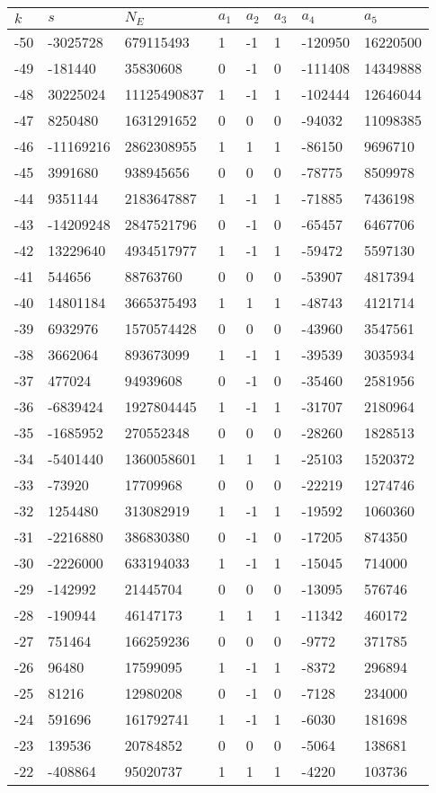 \documentclass{amsart}
\begin{document}
\begin{longtable}{|l|l|l|lllll|}
\hline
$k$ & $s$ & $N_E$ & $a_1$ & $a_2$ & $a_3$ & $a_4$ & $a_5$\\
\hline
-50&-3025728&679115493&1&-1&1&-120950&16220500\\
-49&-181440&35830608&0&-1&0&-111408&14349888\\
-48&30225024&11125490837&1&-1&1&-102444&12646044\\
-47&8250480&1631291652&0&0&0&-94032&11098385\\
-46&-11169216&2862308955&1&1&1&-86150&9696710\\
-45&3991680&938945656&0&0&0&-78775&8509978\\
-44&9351144&2183647887&1&-1&1&-71885&7436198\\
-43&-14209248&2847521796&0&-1&0&-65457&6467706\\
-42&13229640&4934517977&1&-1&1&-59472&5597130\\
-41&544656&88763760&0&0&0&-53907&4817394\\
-40&14801184&3665375493&1&1&1&-48743&4121714\\
-39&6932976&1570574428&0&0&0&-43960&3547561\\
-38&3662064&893673099&1&-1&1&-39539&3035934\\
-37&477024&94939608&0&-1&0&-35460&2581956\\
-36&-6839424&1927804445&1&-1&1&-31707&2180964\\
-35&-1685952&270552348&0&0&0&-28260&1828513\\
-34&-5401440&1360058601&1&1&1&-25103&1520372\\
-33&-73920&17709968&0&0&0&-22219&1274746\\
-32&1254480&313082919&1&-1&1&-19592&1060360\\
-31&-2216880&386830380&0&-1&0&-17205&874350\\
-30&-2226000&633194033&1&-1&1&-15045&714000\\
-29&-142992&21445704&0&0&0&-13095&576746\\
-28&-190944&46147173&1&1&1&-11342&460172\\
-27&751464&166259236&0&0&0&-9772&371785\\
-26&96480&17599095&1&-1&1&-8372&296894\\
-25&81216&12980208&0&-1&0&-7128&234000\\
-24&591696&161792741&1&-1&1&-6030&181698\\
-23&139536&20784852&0&0&0&-5064&138681\\
-22&-408864&95020737&1&1&1&-4220&103736\\

\end{longtable}
\end{document}
